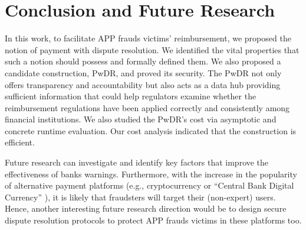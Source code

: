 
 \vspace{-3mm}
\section{Conclusion and Future Research}\label{sec::conclusion}



In this work, to facilitate APP frauds victims’ reimbursement,  we proposed the notion of payment with dispute resolution. We identified the vital properties that such a notion should possess and formally defined them. We also proposed a candidate construction,  PwDR, and proved its security.  The PwDR not only offers transparency and accountability but also acts as a data hub providing sufficient information that could help regulators examine whether the reimbursement regulations have been applied correctly and consistently among financial institutions.  We also studied the PwDR's cost via asymptotic and concrete runtime evaluation. Our cost analysis indicated that the construction is efficient. 



Future research can investigate and identify key factors that improve the effectiveness of banks warnings.  Furthermore, with the increase in the popularity of alternative payment platforms (e.g.,  cryptocurrency or ``Central Bank Digital Currency'' \cite{CBDC}), it is likely that fraudsters will target their (non-expert) users. Hence, another interesting future research direction would be to design secure dispute resolution protocols to protect  APP frauds victims in these platforms too. 



